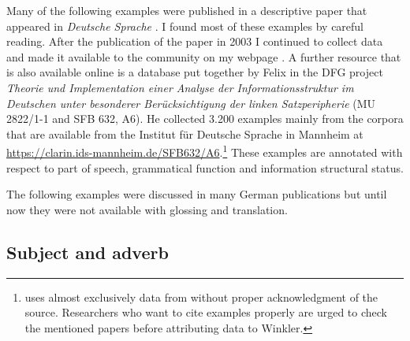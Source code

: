 Many of the following examples were published in a descriptive paper that appeared in \emph{Deutsche
  Sprache} \citep{Mueller2003b}. I found most of these examples by careful reading. After the
publication of the paper in 2003 I continued to collect data and made it available to the community
on my webpage \citep{Mueller2013a}. A further resource that is also available online is a database
put together by Felix \citet{Bildhauer2011a} in the DFG project \emph{Theorie und Implementation
  einer Analyse der Informationsstruktur im Deutschen unter besonderer Berücksichtigung der linken
  Satzperipherie} (MU 2822/1-1 and SFB 632, A6). He collected 3.200 examples mainly from the corpora
that are available from the Institut für Deutsche Sprache in Mannheim at \url{https://clarin.ids-mannheim.de/SFB632/A6}.\footnote{
  \citet{Winkler2014a} uses almost exclusively data from
   without proper
  acknowledgment of the source. Researchers who want to cite examples properly are urged to check
  the mentioned papers before attributing data to Winkler.
}
These examples are annotated with respect to part of speech, grammatical function and information structural status.

The following examples were discussed in many German publications but until now they were not
available with glossing and translation.





\subsection{Subject and adverb}
\label{sec-subj-mf}

